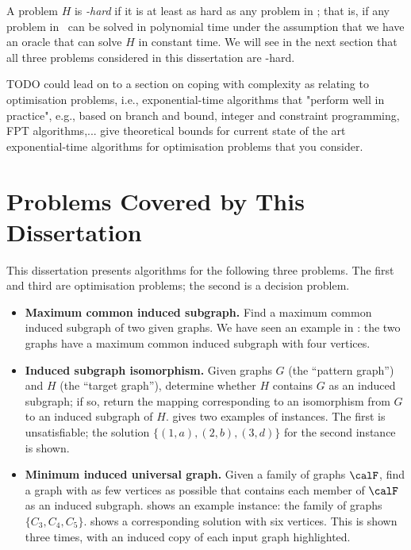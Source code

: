 A problem $H$ is \emph{\NP-hard} if it is at least as hard as any problem in \NP;
that is, if any problem in \NP\ can be solved in polynomial time under the assumption
that we have an oracle that can solve $H$ in constant time.  We will see in the next
section that all three problems considered in this dissertation are \NP-hard.

TODO could lead on to a section on coping with complexity as relating to optimisation problems, i.e., exponential-time algorithms that "perform well in practice", e.g., based on branch and bound, integer and constraint programming, FPT algorithms,...
give theoretical bounds for current state of the art exponential-time algorithms for optimisation problems that you consider.

\section{Problems Covered by This Dissertation}\label{sec:problems}

This dissertation presents algorithms for the following three problems.
The first and third are optimisation problems; the second
is a decision problem.

\begin{itemize}
    \item \textbf{Maximum common induced subgraph.} Find
a maximum common induced subgraph of two given graphs.  We have seen an example
in : the two graphs have a maximum common induced subgraph
with four vertices.
    \item \textbf{Induced subgraph isomorphism.} Given graphs $G$ (the ``pattern graph'')
    and $H$ (the ``target graph''),
determine whether $H$ contains $G$ as an induced subgraph;
if so, return the mapping corresponding to an isomorphism from $G$ to an
        induced subgraph of $H$.
     gives two examples of instances. The first is unsatisfiable;
        the solution $\{(1,a),(2,b), (3,d)\}$ for the second instance is shown.
    \item \textbf{Minimum induced universal graph.} Given a family of graphs $\calF$,
find a graph with as few vertices as possible that contains each member of $\calF$
as an induced subgraph.
     shows an example instance: the family
        of graphs $\{C_3, C_4, C_5\}$.  
     shows a corresponding solution with six vertices.
        This is shown three times, with an induced copy of each input graph
        highlighted.
\end{itemize}

